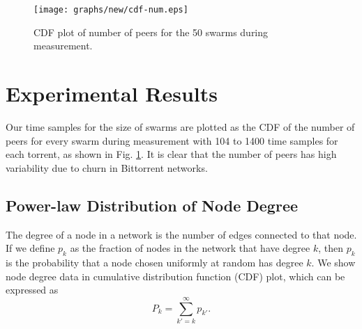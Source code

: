 \documentclass[paper]{ieice}
\begin{document}
\begin{figure}[!t]
\begin{center}
\texttt{[image: graphs/new/cdf-num.eps]}
\end{center}
\caption{CDF plot of number of peers for the 50 swarms during measurement.}
\label{fig:num_peers}
\vspace{-6mm}
\end{figure}

\section{Experimental Results}\label{result}
Our time samples for the size of swarms are plotted as the CDF of the number of peers for every swarm during measurement with 104 to 1400 time samples for each torrent, as shown in Fig. \ref{fig:num_peers}. 
It is clear that the number of peers has high variability due to churn in Bittorrent networks. 

\subsection{Power-law Distribution of Node Degree}
The degree of a node in a network is the number of edges connected to that node. 
If we define $p_k$ as the  fraction of nodes in the network that have degree $k$, then $p_k$ is the probability that a node chosen uniformly at random has degree $k$. 
We show node degree data in cumulative distribution function (CDF) plot, which can be expressed as
\begin{equation}
P_k = \sum_{k'=k}^{\infty} p_{k'}.
\end{equation}
\end{document}
